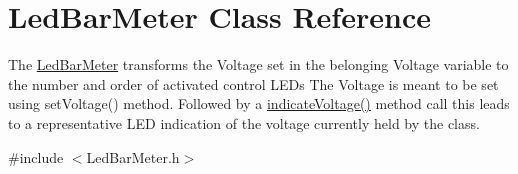 \hypertarget{class_led_bar_meter}{}\section{Led\+Bar\+Meter Class Reference}
\label{class_led_bar_meter}


The \mbox{\hyperlink{class_led_bar_meter}{Led\+Bar\+Meter}} transforms the Voltage set in the belonging Voltage variable to the number and order of activated control L\+E\+Ds The Voltage is meant to be set using set\+Voltage() method. Followed by a \mbox{\hyperlink{class_led_bar_meter_a0c03c62888de6aee1825e1f3a67add37}{indicate\+Voltage()}} method call this leads to a representative L\+ED indication of the voltage currently held by the class.  




{\ttfamily \#include $<$Led\+Bar\+Meter.\+h$>$}

